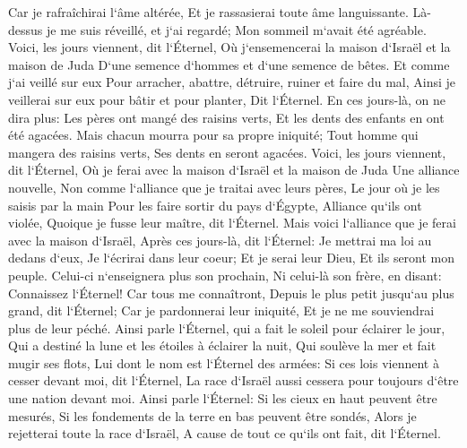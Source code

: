 \verse Car je rafraîchirai l`âme altérée, Et je rassasierai toute âme languissante. 
\verse Là-dessus je me suis réveillé, et j`ai regardé; Mon sommeil m`avait été agréable. 
\verse Voici, les jours viennent, dit l`Éternel, Où j`ensemencerai la maison d`Israël et la maison de Juda D`une semence d`hommes et d`une semence de bêtes. 
\verse Et comme j`ai veillé sur eux Pour arracher, abattre, détruire, ruiner et faire du mal, Ainsi je veillerai sur eux pour bâtir et pour planter, Dit l`Éternel. 
\verse En ces jours-là, on ne dira plus: Les pères ont mangé des raisins verts, Et les dents des enfants en ont été agacées. 
\verse Mais chacun mourra pour sa propre iniquité; Tout homme qui mangera des raisins verts, Ses dents en seront agacées. 
\verse Voici, les jours viennent, dit l`Éternel, Où je ferai avec la maison d`Israël et la maison de Juda Une alliance nouvelle, 
\verse Non comme l`alliance que je traitai avec leurs pères, Le jour où je les saisis par la main Pour les faire sortir du pays d`Égypte, Alliance qu`ils ont violée, Quoique je fusse leur maître, dit l`Éternel. 
\verse Mais voici l`alliance que je ferai avec la maison d`Israël, Après ces jours-là, dit l`Éternel: Je mettrai ma loi au dedans d`eux, Je l`écrirai dans leur coeur; Et je serai leur Dieu, Et ils seront mon peuple. 
\verse Celui-ci n`enseignera plus son prochain, Ni celui-là son frère, en disant: Connaissez l`Éternel! Car tous me connaîtront, Depuis le plus petit jusqu`au plus grand, dit l`Éternel; Car je pardonnerai leur iniquité, Et je ne me souviendrai plus de leur péché. 
\verse Ainsi parle l`Éternel, qui a fait le soleil pour éclairer le jour, Qui a destiné la lune et les étoiles à éclairer la nuit, Qui soulève la mer et fait mugir ses flots, Lui dont le nom est l`Éternel des armées: 
\verse Si ces lois viennent à cesser devant moi, dit l`Éternel, La race d`Israël aussi cessera pour toujours d`être une nation devant moi. 
\verse Ainsi parle l`Éternel: Si les cieux en haut peuvent être mesurés, Si les fondements de la terre en bas peuvent être sondés, Alors je rejetterai toute la race d`Israël, A cause de tout ce qu`ils ont fait, dit l`Éternel. 
